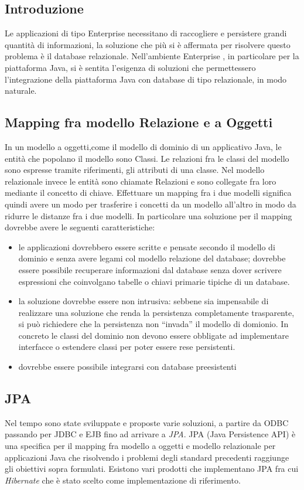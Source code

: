 \subsection{Introduzione}
Le applicazioni di tipo Enterprise necessitano di raccogliere e persistere grandi quantità di informazioni, la soluzione che più si è affermata per risolvere questo problema è il database relazionale. Nell'ambiente Enterprise
, in particolare per la piattaforma Java, si è sentita l'esigenza di soluzioni che permettessero l'integrazione della piattaforma Java con database di tipo relazionale, in modo naturale. 

\subsection{Mapping fra modello Relazione e a Oggetti}
In un modello a oggetti,come il modello di dominio di un applicativo Java, le entità che popolano il modello sono Classi. Le relazioni fra le classi del modello sono espresse tramite riferimenti, gli attributi di una classe.
Nel modello relazionale invece le entità sono chiamate Relazioni e sono collegate fra loro mediante il concetto di chiave. Effettuare un mapping fra i due modelli significa quindi avere un modo per trasferire i concetti da un modello
all'altro in modo da ridurre le distanze fra i due modelli. In particolare una soluzione per il mapping dovrebbe avere le seguenti caratteristiche:

\begin{itemize}
 \item le applicazioni dovrebbero essere scritte e pensate secondo il modello di dominio e senza avere legami col modello relazione del database; dovrebbe essere possibile recuperare informazioni dal database senza dover scrivere espressioni
 che coinvolgano tabelle o chiavi primarie tipiche di un database.
 \item la soluzione dovrebbe essere non intrusiva: sebbene sia impensabile di realizzare una soluzione che renda la persistenza completamente trasparente, si può richiedere che la persistenza non ``invada'' il modello di domionio.
  In concreto le classi del dominio non devono essere obbligate ad implementare interfacce o estendere classi per poter essere rese persistenti.
  \item dovrebbe essere possibile integrarsi con database preesistenti
\end{itemize}


\subsection{JPA}
Nel tempo sono state sviluppate e proposte varie soluzioni, a partire da ODBC passando per JDBC e EJB fino ad arrivare a \textsl{JPA}.
JPA (Java Persistence API) è una specifica per il mapping fra modello a oggetti e modello relazionale per applicazioni Java che risolvendo i problemi degli standard precedenti raggiunge
gli obiettivi sopra formulati. Esistono vari prodotti che implementano JPA fra cui \textsl{Hibernate} che è stato scelto come
implementazione di riferimento.

